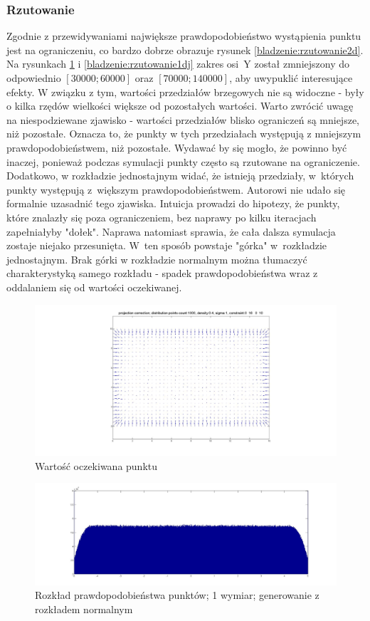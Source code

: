 \documentclass{mini}
\begin{document}
\subsubsection*{Rzutowanie}
Zgodnie z przewidywaniami największe prawdopodobieństwo wystąpienia punktu jest na ograniczeniu, co bardzo dobrze obrazuje rysunek \ref{bladzenie:rzutowanie2d}. Na rysunkach \ref{bladzenie:rzutowanie1dn} i \ref{bladzenie:rzutowanie1dj} zakres osi~Y został zmniejszony do odpowiednio $[30000;60000]$ oraz $[70000;140000]$, aby uwypuklić interesujące efekty. W związku z tym, wartości przedziałów brzegowych nie są widoczne - były o kilka rzędów wielkości większe od pozostałych wartości. Warto zwrócić uwagę na niespodziewane zjawisko - wartości przedziałów blisko ograniczeń są mniejsze, niż pozostałe. Oznacza to, że punkty w tych przedziałach występują z mniejszym prawdopodobieństwem, niż pozostałe. Wydawać by się mogło, że powinno być inaczej, ponieważ podczas symulacji punkty często są rzutowane na ograniczenie. Dodatkowo, w rozkładzie jednostajnym widać, że istnieją przedziały, w~których punkty występują z~większym prawdopodobieństwem. Autorowi nie udało się formalnie uzasadnić tego zjawiska. Intuicja prowadzi do hipotezy, że punkty, które znalazły się poza ograniczeniem, bez naprawy po kilku iteracjach zapełniałyby "dołek". Naprawa natomiast sprawia, że cała dalsza symulacja zostaje niejako przesunięta. W~ten sposób powstaje "górka" w~rozkładzie jednostajnym. Brak górki w rozkładzie normalnym można tłumaczyć charakterystyką samego rozkładu - spadek prawdopodobieństwa wraz z oddalaniem się od wartości oczekiwanej.

\begin{figure}[H]
\centering
\includegraphics[width=\textwidth]{projection2dprzesuniecie}
\caption{Wartość oczekiwana punktu}
\end{figure}

\begin{figure}[H]
\centering
\includegraphics[width=\textwidth]{p_n_50M_1__5_5}
\caption{Rozkład prawdopodobieństwa punktów; 1 wymiar; generowanie z rozkładem normalnym}
\label{bladzenie:rzutowanie1dn}
\end{figure}
\end{document}
